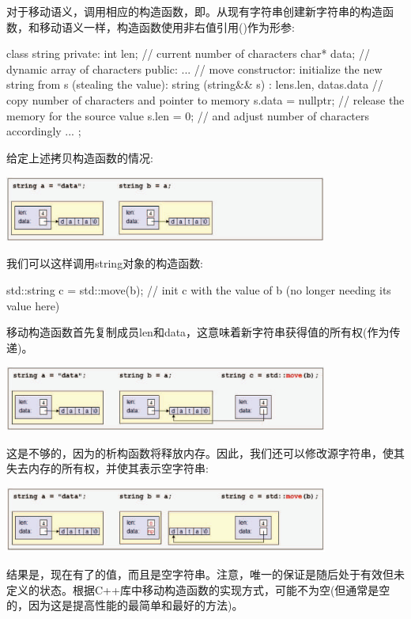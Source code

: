 对于移动语义，调用相应的构造函数，即。从现有字符串创建新字符串的构造函数，和移动语义一样，构造函数使用非右值引用(\cppinline{\&\&})作为形参:

\begin{cppcode}
class string {
	private:
	int len; // current number of characters
	char* data; // dynamic array of characters
	public:
	...
	// move constructor: initialize the new string from s (stealing the value):
	string (string&& s)
	: len{s.len}, data{s.data} { // copy number of characters and pointer to memory
		s.data = nullptr; // release the memory for the source value
		s.len = 0; // and adjust number of characters accordingly
	}
	...
};
\end{cppcode}

给定上述拷贝构造函数的情况:

\begin{center}
	\includegraphics[width=0.8\textwidth]{part1/ch1/images/20}
\end{center}

我们可以这样调用string对象的构造函数:

\begin{cppcode}
std::string c = std::move(b); // init c with the value of b (no longer needing its value here)
\end{cppcode}

移动构造函数首先复制成员len和data，这意味着新字符串获得值的所有权(作为传递)。

\begin{center}
	\includegraphics[width=0.8\textwidth]{part1/ch1/images/21}
\end{center}

这是不够的，因为的析构函数将释放内存。因此，我们还可以修改源字符串，使其失去内存的所有权，并使其表示空字符串:

\begin{center}
	\includegraphics[width=0.8\textwidth]{part1/ch1/images/22}
\end{center}

结果是，现在有了的值，而且是空字符串。注意，唯一的保证是随后处于有效但未定义的状态。根据C++库中移动构造函数的实现方式，可能不为空(但通常是空的，因为这是提高性能的最简单和最好的方法)。


















